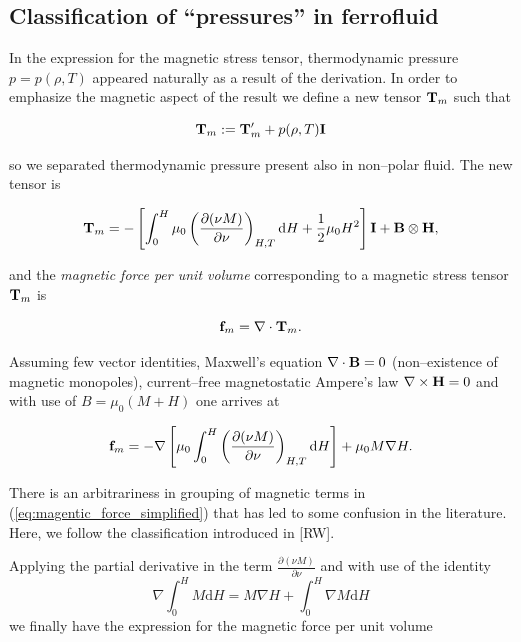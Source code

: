 \subsection{Classification of ``pressures'' in ferrofluid}

In the expression for the magnetic stress tensor, thermodynamic pressure $p = p(\rho, T)$ appeared naturally as a result of the derivation. In order to emphasize the magnetic aspect of the result we define a new tensor $\mathbf{T}_m$ such that

$$ \mathbf{T}_m := \mathbf{T}'_m + p(\rho, T)\mathbf{I} $$

so we separated thermodynamic pressure present also in non--polar fluid. The new tensor is

\begin{equation}
\mathbf{T}_m = - \left[ \int_0^H \mu_0 \left( \frac{\partial(\nu M)}{\partial \nu} \right)_{H, T} \mathrm{d}H + \frac{1}{2} \mu_0 H^2  \right] \mathbf{I} + \mathbf{B} \otimes \mathbf{H},
\label{eq:magnetic_stress_tensor_new}
\end{equation}

and the \emph{magnetic force per unit volume} corresponding to a magnetic stress tensor $\mathbf{T}_m$ is

\begin{equation}
\mathbf{f}_m = \mathbf{\nabla} \cdot \mathbf{T}_m. 
\label{eq:magnetic_force}
\end{equation}

Assuming few vector identities, Maxwell's equation $\nabla \cdot \mathbf{B} = 0$ (non--existence of magnetic monopoles), current--free magnetostatic Ampere's law $\nabla \times \mathbf{H} = 0$ and with use of $B = \mu_0(M + H)$ one arrives at 

\begin{equation}
\mathbf{f}_m = - \nabla \left[  \mu_0 \int_0^H \left( \frac{\partial(\nu M)}{\partial \nu} \right)_{H, T} \mathrm{d}H   \right] + \mu_0 M \nabla H.
\label{eq:magentic_force_simplified}
\end{equation}

There is an arbitrariness in grouping of magnetic terms in (\ref{eq:magentic_force_simplified}) that has led to some confusion in the literature. Here, we follow the classification introduced in [RW].

Applying the partial derivative in the term $\frac{\partial(\nu M)}{\partial \nu}$ and with use of the identity
$$ \nabla \int_0^H M \mathrm{d}H = M \nabla H + \int_0^H \nabla M \mathrm{d}H $$ we finally have the expression for the magnetic force per unit volume

